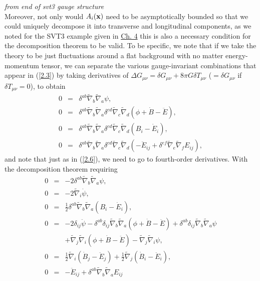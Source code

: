 \emph{from end of svt3 gauge structure}\\
Moreover, not only would  $A_i({\bf x})$ need to be asymptotically bounded so that we could uniquely decompose it into transverse and longitudinal components, as we noted for the SVT3 example given in \hyperref[c:decomposition_theorem]{Ch. 4} this is also a necessary condition for the decomposition theorem to be valid. To be specific, we note that if we take the theory to be just fluctuations around a flat background with no matter energy-momentum tensor, we can separate the various gauge-invariant combinations that appear in (\ref{2.3}) by taking derivatives of $\Delta G_{\mu\nu}=\delta G_{\mu\nu}+8\pi G \delta T_{\mu\nu}$ ($=\delta G_{\mu\nu}$ if $\delta T_{\mu\nu}=0$), to obtain
%
\begin{eqnarray}
0&=&\delta^{ab} \tilde{\nabla}_{b}\tilde{\nabla}_{a}\psi,
\nonumber\\
0&=&\delta^{ab} \tilde{\nabla}_{b}\tilde{\nabla}_{a} \delta^{cd} \tilde{\nabla}_{c}\tilde{\nabla}_{d}(\phi+\dot{B}  -\ddot{E}),
\nonumber\\
0&=&\delta^{ab} \tilde{\nabla}_{b}\tilde{\nabla}_{a} \delta^{cd} \tilde{\nabla}_{c}\tilde{\nabla}_{d}(B_i-\dot{E}_i),
\nonumber\\
0&=&\delta^{ab} \tilde{\nabla}_{b}\tilde{\nabla}_{a} \delta^{cd} \tilde{\nabla}_{c}\tilde{\nabla}_{d}(-\ddot{E}_{ij}+\delta^{ef} \tilde{\nabla}_{e}\tilde{\nabla}_{f}E_{ij}),
\label{2.19}
\end{eqnarray}
%
and note that just as in (\ref{2.6}), we need to go to fourth-order derivatives. With the decomposition theorem requiring
%
\begin{eqnarray}
0&=&- 2 \delta^{ab} \tilde{\nabla}_{b}\tilde{\nabla}_{a}\psi,
\nonumber\\
0&=&- 2 \tilde{\nabla}_{i}\dot{\psi},
\nonumber\\
0&=&\tfrac{1}{2} \delta^{ab} \tilde{\nabla}_{b}\tilde{\nabla}_{a}(B_{i} -  \dot{E}_{i}),
\nonumber\\
0&=&-2 \delta_{ij} \ddot{\psi} -  \delta^{ab} \delta_{ij} \tilde{\nabla}_{b}\tilde{\nabla}_{a}(\phi+\dot{B}  -\ddot{E})+ \delta^{ab} \delta_{ij} \tilde{\nabla}_{b}\tilde{\nabla}_{a}\psi 
\nonumber\\
&& +\tilde{\nabla}_{j}\tilde{\nabla}_{i}(\phi+\dot{B} -  \ddot{E}) - \tilde{\nabla}_{j}\tilde{\nabla}_{i}\psi,
\nonumber\\
0&=&\tfrac{1}{2} \tilde{\nabla}_{i}(\dot{B}_{j} - \ddot{E}_{j}) + \tfrac{1}{2} \tilde{\nabla}_{j}(\dot{B}_{i} 
- \ddot{E}_{i}),
\nonumber\\
0&=&- \ddot{E}_{ij} + \delta^{ab} \tilde{\nabla}_{b}\tilde{\nabla}_{a}E_{ij}
\label{2.20}
\end{eqnarray}
